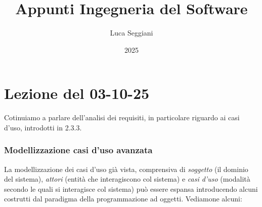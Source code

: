 \documentclass[a4paper,11pt]{article}
\title{Appunti Ingegneria del Software}
\author{Luca Seggiani}
\date{2025}
\begin{document}
\section{Lezione del 03-10-25}

\thispagestyle{empty}
\pagestyle{fancy}

Cotinuiamo a parlare dell'analisi dei requisiti, in particolare riguardo ai casi d'uso, introdotti in 2.3.3.

\subsubsection{Modellizzazione casi d'uso avanzata}
La modellizzazione dei casi d'uso già vista, comprensiva di \textit{soggetto} (il dominio del sistema), \textit{attori} (entità che interagiscono col sistema) e \textit{casi d'uso} (modalità secondo le quali si interagisce col sistema) può essere espansa introducendo alcuni costrutti dal paradigma della programmazione ad oggetti. Vediamone alcuni:
\end{document}
